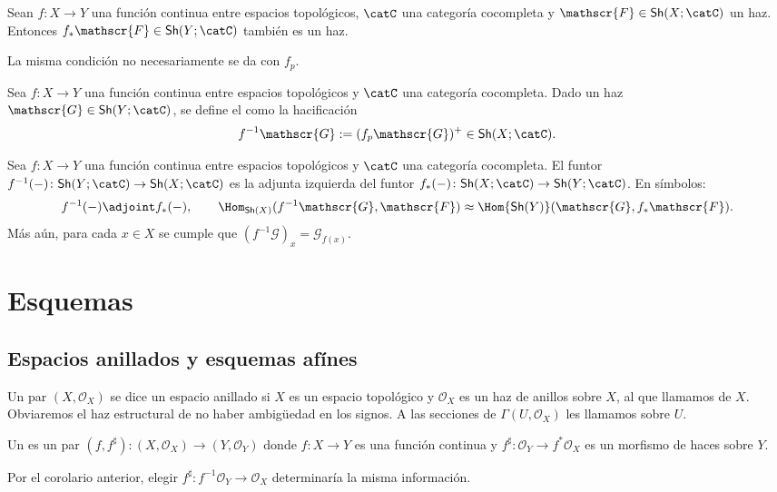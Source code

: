 \begin{prop}
	Sean $f \colon X \to Y$ una función continua entre espacios topológicos, $\catC$ una categoría cocompleta y $\mathscr{F} \in \mathsf{Sh}(X; \catC)$ un haz.
	Entonces $f_* \mathscr{F} \in \mathsf{Sh}(Y; \catC)$ también es un haz.
\end{prop}
La misma condición no necesariamente se da con $f_p$.
\begin{mydef}
	Sea $f \colon X \to Y$ una función continua entre espacios topológicos y $\catC$ una categoría cocompleta.
	Dado un haz $\mathscr{G} \in \mathsf{Sh}(Y; \catC)$, se define el  como la hacificación
	$$ f^{-1} \mathscr{G} := (f_p\mathscr{G})^+ \in \mathsf{Sh}(X; \catC). $$
\end{mydef}
\begin{cor}
	Sea $f \colon X \to Y$ una función continua entre espacios topológicos y $\catC$ una categoría cocompleta.
	El funtor $f^{-1}(-) \colon \mathsf{Sh}(Y ; \catC) \to \mathsf{Sh}(X; \catC)$ es la adjunta izquierda del
	funtor $f_*(-) \colon \mathsf{Sh}(X; \catC) \to \mathsf{Sh}(Y; \catC)$.
	En símbolos:
	$$ f^{-1}(-) \adjoint f_*(-), \qquad \Hom_{\mathsf{Sh}(X)} (f^{-1} \mathscr{G}, \mathscr{F}) \approx \Hom{\mathsf{Sh}(Y)} (\mathscr{G}, f_* \mathscr{F}). $$
	Más aún, para cada $x \in X$ se cumple que $(f^{-1} \mathscr{G})_x = \mathscr{G}_{f(x)}$.
\end{cor}

\section{Esquemas}
\subsection{Espacios anillados y esquemas afínes}
\begin{mydefi}
	Un par $(X, \mathscr{O}_X)$ se dice un espacio anillado si $X$ es un espacio topológico y $\mathscr{O}_X$ es un haz de anillos sobre $X$,
	al que llamamos  de $X$.
	Obviaremos el haz estructural de no haber ambigüedad en los signos.
	A las secciones de $\Gamma(U, \mathscr{O}_X )$ les llamamos  sobre $U$.

	Un  es un par $(f, f^\sharp ) \colon (X, \mathscr{O}_X ) \to (Y, \mathscr{O}_Y )$
	donde $f \colon X \to Y$ es una función continua y $f^\sharp \colon \mathscr{O}_Y \to f^* \mathscr{O}_X$ es un morfismo de haces sobre $Y$.
\end{mydefi}
Por el corolario anterior, elegir $f^\sharp \colon f^{-1} \mathscr{O}_Y \to \mathscr{O}_X$ determinaría la misma información.

